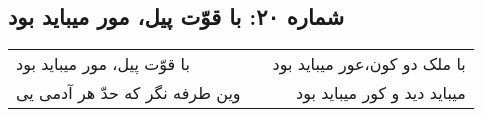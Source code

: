 \begin{center}
\section*{شماره ۲۰: با قوّت پیل، مور میباید بود}
\label{sec:020}
\begin{longtable}{l p{0.5cm} r}
با قوّت پیل، مور میباید بود
&&
با ملک دو کون،عور میباید بود
\\
وین طرفه نگر که حدّ هر آدمی یی
&&
میباید دید و کور میباید بود
\\
\end{longtable}
\end{center}
